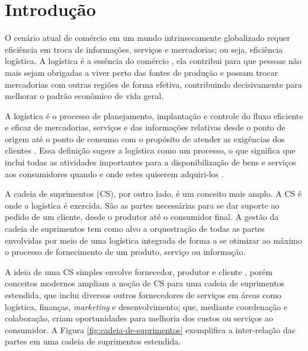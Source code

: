 \documentclass[
	12pt,				%
	oneside,			%
	a4paper,			%
	english,			%
	brazil				%
]{abntex2}
\begin{document}
\textual

\chapter{Introdução}

	O cenário atual de comércio em um mundo intrinsecamente globalizado requer eficiência em troca de informações, serviços e mercadorias; ou seja, eficiência logística. A logística é a essência do comércio \cite{ballou2006cadeiasuprimentos}, ela contribui para que pessoas não mais sejam obrigadas a viver perto das fontes de produção e possam trocar mercadorias com outras regiões de forma efetiva, contribuindo decisivamente para melhorar o padrão econômico de vida geral. 
	
	A logística é o processo de planejamento, implantação e controle do fluxo eficiente e eficaz de mercadorias, serviços e das informações relativas desde o ponto de origem até o ponto de consumo com o propósito de atender as exigências dos clientes \cite{cscmp2013supplychainglossary}. Essa definição sugere a logística como um processo, o que significa que inclui todas as atividades importantes para a disponibilização de bens e serviços aos consumidores quando e onde estes quiserem adquiri-los \cite{ballou2006cadeiasuprimentos}.
	
	A cadeia de suprimentos (CS), por outro lado, é um conceito mais amplo. A CS é onde a logística é exercida. São as partes necessárias para se dar suporte ao pedido de um cliente, desde o produtor até o consumidor final. A gestão da cadeia de suprimentos tem como alvo a orquestração de todas as partes envolvidas por meio de uma logística integrada de forma a se otimizar ao máximo o processo de fornecimento de um produto, serviço ou informação.
	
	A ideia de uma CS simples envolve fornecedor, produtor e cliente \cite{hugos2018supplychain}, porém conceitos modernos ampliam a noção de CS para uma cadeia de suprimentos estendida, que inclui diversos outros fornecedores de serviços em áreas como logística, finanças, \textit{marketing} e desenvolvimento; que, mediante coordenação e colaboração, criam oportunidades para melhoria dos custos ou serviços ao consumidor. A Figura \ref{fig:cadeia-de-suprimentos} exemplifica a inter-relação das partes em uma cadeia de suprimentos estendida.
	
\end{document}

